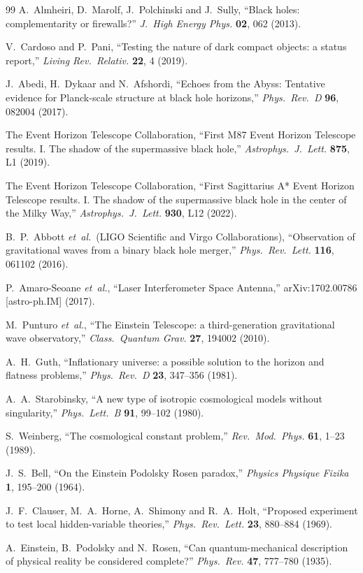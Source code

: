 \documentclass[a4paper]{article}
\begin{document}
\begin{thebibliography}{99}
A.~Almheiri, D.~Marolf, J.~Polchinski and J.~Sully,
``Black holes: complementarity or firewalls?''
\textit{J.\ High Energy Phys.} \textbf{02}, 062 (2013).

V.~Cardoso and P.~Pani,
``Testing the nature of dark compact objects: a status report,''
\textit{Living Rev.\ Relativ.} \textbf{22}, 4 (2019).

J.~Abedi, H.~Dykaar and N.~Afshordi,
``Echoes from the Abyss: Tentative evidence for Planck-scale structure at black hole horizons,''
\textit{Phys.\ Rev.\ D} \textbf{96}, 082004 (2017).

The Event Horizon Telescope Collaboration,
``First M87 Event Horizon Telescope results. I. The shadow of the supermassive black hole,''
\textit{Astrophys.\ J.\ Lett.} \textbf{875}, L1 (2019).

The Event Horizon Telescope Collaboration,
``First Sagittarius A* Event Horizon Telescope results. I. The shadow of the supermassive black hole in the center of the Milky Way,''
\textit{Astrophys.\ J.\ Lett.} \textbf{930}, L12 (2022).

B.~P.~Abbott \textit{et~al.}\ (LIGO Scientific and Virgo Collaborations),
``Observation of gravitational waves from a binary black hole merger,''
\textit{Phys.\ Rev.\ Lett.} \textbf{116}, 061102 (2016).

P.~Amaro-Seoane \textit{et~al.},
``Laser Interferometer Space Antenna,''
arXiv:1702.00786 [astro-ph.IM] (2017).

M.~Punturo \textit{et~al.},
``The Einstein Telescope: a third-generation gravitational wave observatory,''
\textit{Class.\ Quantum Grav.} \textbf{27}, 194002 (2010).

A.~H.~Guth,
``Inflationary universe: a possible solution to the horizon and flatness problems,''
\textit{Phys.\ Rev.\ D} \textbf{23}, 347--356 (1981).

A.~A.~Starobinsky,
``A new type of isotropic cosmological models without singularity,''
\textit{Phys.\ Lett.\ B} \textbf{91}, 99--102 (1980).

S.~Weinberg,
``The cosmological constant problem,''
\textit{Rev.\ Mod.\ Phys.} \textbf{61}, 1--23 (1989).

J.~S.~Bell,
``On the Einstein Podolsky Rosen paradox,''
\textit{Physics Physique Fizika} \textbf{1}, 195--200 (1964).

J.~F.~Clauser, M.~A.~Horne, A.~Shimony and R.~A.~Holt,
``Proposed experiment to test local hidden-variable theories,''
\textit{Phys.\ Rev.\ Lett.} \textbf{23}, 880--884 (1969).

A.~Einstein, B.~Podolsky and N.~Rosen,
``Can quantum-mechanical description of physical reality be considered complete?''
\textit{Phys.\ Rev.} \textbf{47}, 777--780 (1935).

\end{thebibliography}
\end{document}
